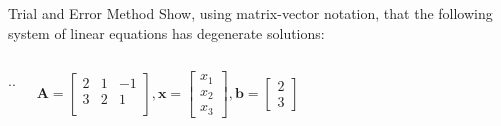 \begin{frameExample}{Trial and Error Method}{}
  Show, using matrix-vector notation, that the following system of linear equations has degenerate solutions:

  \begin{columns}

    {
      \centering
      \sysdelim..%
      \par
}
  \[\bm{A} =%
    \begin{bmatrix}
      2 & 1 & -1\\
      3 & 2 & 1 \\
    \end{bmatrix},
    \bm{x} = %
    \begin{bmatrix}
      x_1\\
      x_2\\
      x_3
    \end{bmatrix},
    \bm{b} = %
    \begin{bmatrix}
      2\\
      3
    \end{bmatrix}
  \]
  \end{columns}
\end{frameExample}

